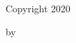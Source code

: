 \begin{center}
	\vspace{1in}  Copyright 2020\par
	\vspace{.1in} by\par
	\makeatletter
	\vspace{.1in} \@author{}
	\makeatother
\end{center}
